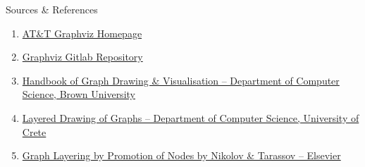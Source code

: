 \documentclass{beamer}
\begin{document}
\begin{frame}{Sources \& References}
    

    \begin{enumerate}
        
        \item \href{https://graphviz.org/}{AT\&T Graphviz Homepage}
        \item \href{https://gitlab.com/graphviz/graphviz/}{Graphviz Gitlab Repository}
        \item \href{https://cs.brown.edu/people/rtamassi/gdhandbook/}{Handbook of Graph Drawing \& Visualisation – Department of Computer Science, Brown University}
        \item \href{https://www.csd.uoc.gr/~hy583/papers/ch10.pdf}{Layered Drawing of Graphs – Department of Computer Science, University of Crete}
        \item \href{https://www.researchgate.net/publication/220568801_Graph_Layering_by_Promotion_of_Nodes}{Graph Layering by Promotion of Nodes by Nikolov \& Tarassov – Elsevier}

    \end{enumerate}
    

\end{frame}
\end{document}
